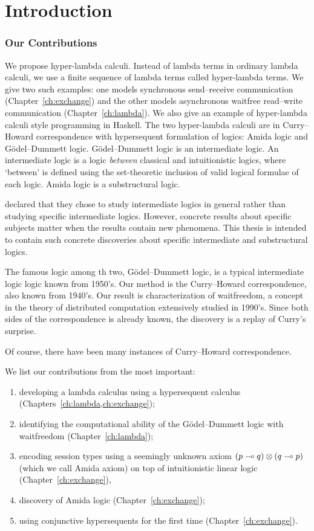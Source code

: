 \chapter{Introduction}

\subsection{Our Contributions}

We propose hyper-lambda calculi.
Instead of lambda terms in ordinary lambda calculi,
we use a finite sequence of lambda terms called hyper-lambda terms.
We give two such examples:
one models synchronous send--receive communication (Chapter~\ref{ch:exchange}) and
the other models asynchronous waitfree
read--write communication (Chapter~\ref{ch:lambda}).
We also give an example of hyper-lambda calculi style programming in Haskell.
The two hyper-lambda calculi are in Curry--Howard correspondence with
hypersequent formulation of logics: Amida logic and G\"odel--Dummett
logic.
G\"odel--Dummett logic is an intermediate logic.
An intermediate logic is a logic \textit{between} classical and
intuitionistic logics, where `between' is defined using the
set-theoretic inclusion of valid logical formulae of each logic.
Amida logic is a substructural logic.

\citet{hosoi-ono} declared that they chose to study intermediate
logics in
general rather than studying specific intermediate logics.
However, concrete results about specific subjects matter when the
results contain new phenomena.
This thesis is intended to contain such concrete discoveries
about specific intermediate and substructural logics.

The famous logic among th two,
G\"odel--Dummett logic, is
a typical intermediate logic logic known from 1950's.
Our method is the Curry--Howard correspondence, also known from 1940's.
Our result is characterization of waitfreedom, a concept in the theory
of distributed computation extensively studied in 1990's.
Since both sides of the correspondence is already known,
the discovery is a replay of Curry's surprise.

Of course, there have been many instances of Curry--Howard correspondence.

We list our contributions from the most important:
\begin{enumerate}
 \item developing a lambda calculus using
       a hypersequent calculus (Chapters~\ref{ch:lambda,ch:exchange});
 \item identifying the computational ability of the
       G\"odel--Dummett logic with waitfreedom (Chapter~\ref{ch:lambda});
 \item encoding session types using a seemingly unknown axiom
       $(p\multimap q)\otimes(q\multimap p)$ (which we call Amida axiom) on top
       of intuitionistic linear logic (Chapter~\ref{ch:exchange}),
 \item discovery of Amida logic (Chapter~\ref{ch:exchange});
 \item using conjunctive hypersequents for the first time (Chapter~\ref{ch:exchange}).
\end{enumerate}

